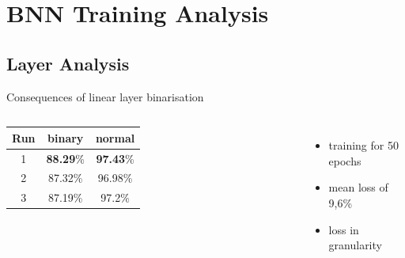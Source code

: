 \documentclass[aspectratio=1610, 12pt]{beamer}
\begin{document}
\section{BNN Training Analysis}
\begin{frame}
	\tableofcontents[currentsection]
\end{frame}
\subsection{Layer Analysis}
\begin{frame}{Consequences of linear layer binarisation}


	\begin{columns}
		\centering
		\begin{tabular}{|c|c|c|}\hline
			Run & binary           & normal           \\\hline
			1   & \textbf{88.29}\% & \textbf{97.43}\% \\\hline
			2   & 87.32\%          & 96.98\%          \\\hline
			3   & 87.19\%          & 97.2\%           \\\hline
		\end{tabular}
		\begin{itemize}
			\item training for 50 epochs
			\item mean loss of 9,6\%
			\item loss in granularity
		\end{itemize}

	\end{columns}


\end{frame}
\end{document}
